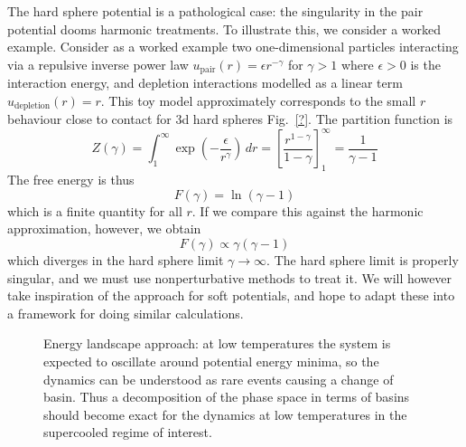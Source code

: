 \documentclass[11pt,twoside]{report}
\begin{document}
The hard sphere potential is a pathological case: the singularity in the pair potential dooms harmonic treatments.
To illustrate this, we consider a worked example.
Consider as a worked example two one-dimensional particles interacting via a repulsive inverse power law $u_{\textrm{pair}}(r) = \epsilon r^{-\gamma}$ for $\gamma > 1$ where $\epsilon > 0$ is the interaction energy, and depletion interactions modelled as a linear term $u_{\textrm{depletion}}(r) = r$.
This toy model approximately corresponds to the small $r$ behaviour close to contact for 3d hard spheres Fig.\ \ref{?}.
The partition function is
\begin{equation}
  Z(\gamma)
  = \int_1^{\infty} \exp{\left(-\frac{\epsilon}{r^\gamma}\right)} \, dr
  = \left[ \frac{r^{1-\gamma}}{1-\gamma} \right]_1^\infty
  = \frac{1}{\gamma - 1}
\end{equation}
The free energy is thus
\begin{equation}
  F(\gamma) = \ln{(\gamma - 1)}
\end{equation}
which is a finite quantity for all $r$.
If we compare this against the harmonic approximation, however, we obtain
\begin{equation}
  F(\gamma) \propto \gamma(\gamma - 1)
\end{equation}
which diverges in the hard sphere limit $\gamma \to \infty$.
The hard sphere limit is properly singular, and we must use nonperturbative methods to treat it.
We will however take inspiration of the approach for soft potentials, and hope to adapt these into a framework for doing similar calculations.

\begin{figure}
  \missingfigure[figwidth=\linewidth]{}
  \caption{Energy landscape approach: at low temperatures the system is expected to oscillate around potential energy minima, so the dynamics can be understood as rare events causing a change of basin.
    Thus a decomposition of the phase space in terms of basins should become exact for the dynamics at low temperatures in the supercooled regime of interest.}
\end{figure}
\end{document}
